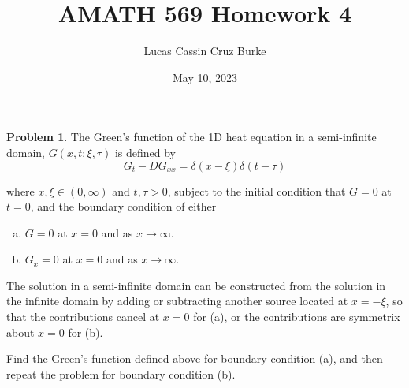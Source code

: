 \documentclass[12pt,a4paper]{article}
\title{AMATH 569 Homework 4}
\author{Lucas Cassin Cruz Burke}
\date{May 10, 2023}
\theoremstyle{definition}
\newtheorem{problem}{Problem}
\theoremstyle{remark}
\begin{document}
\maketitle

\begin{problem}
    The Green's function of the 1D heat equation in a semi-infinite domain, $G(x, t; \xi, \tau)$ is defined by $$G_t - DG_{xx} = \delta(x-\xi)\delta(t-\tau)$$

    where $x, \xi \in (0, \infty)$ and $t, \tau > 0$, subject to the initial condition that $G=0$ at $t=0$, and the boundary condition of either 

    \begin{enumerate}[(a)]
        \item $G=0$ at $x=0$ and as $x\rightarrow \infty$. 
        \item $G_x = 0$ at $x=0$ and as $x \rightarrow \infty$. 
    \end{enumerate}

    The solution in a semi-infinite domain can be constructed from the solution in the infinite domain by adding or subtracting another source located at $x=-\xi$, so that the contributions cancel at $x=0$ for (a), or the contributions are symmetrix about $x=0$ for (b). 

    Find the Green's function defined above for boundary condition (a), and then repeat the problem for boundary condition (b). 
\end{problem}
\end{document}
